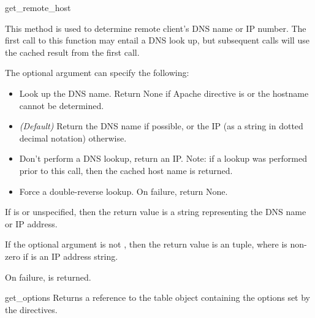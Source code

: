 \begin{methoddesc}[Request]{get_remote_host}{}

This method is used to determine remote client's DNS name or IP
number. The first call to this function may entail a DNS look up, but
subsequent calls will use the cached result from the first call.

The optional  argument can specify the following: 

\begin{itemize}

\item
{} Look up the DNS name. Return None if Apache
directive  is  or the hostname cannot
be determined.

\item                  
{} \emph{(Default)} Return the DNS name if
possible, or the IP (as a string in dotted decimal notation)
otherwise.

\item
{} Don't perform a DNS lookup, return an
IP. Note: if a lookup was performed prior to this call, then the
cached host name is returned.

\item
{} Force a double-reverse lookup. On 
failure, return None.

\end{itemize}

If  is  or unspecified, then the return
value is a string representing the DNS name or IP address.

If the optional  argument is not , then the
return value is an  tuple, where 
is non-zero if  is an IP address string.

On failure,  is returned.

\end{methoddesc}

\begin{methoddesc}[Request]{get_options}{}
Returns a reference to the table object containing the options set by
the  directives.
\end{methoddesc}


